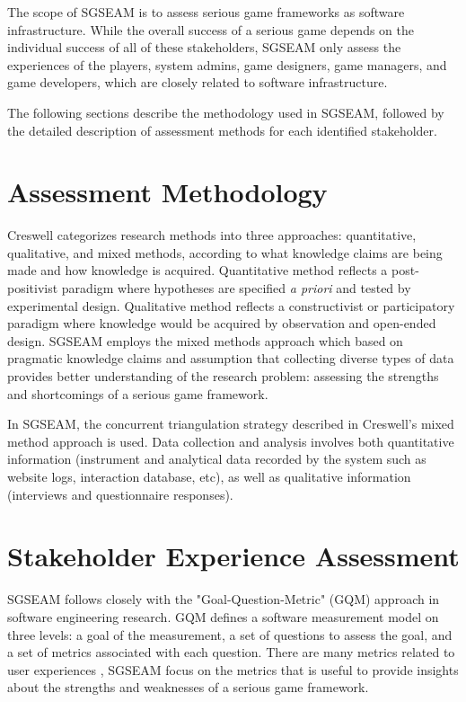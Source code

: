 The scope of SGSEAM is to assess serious game frameworks as software infrastructure. While
the overall success of a serious game depends on the individual success of all of these
stakeholders, SGSEAM only assess the experiences of the players, system admins, game designers, game managers, and game developers, which are closely related to software infrastructure. 

The following sections describe the methodology used in SGSEAM, followed by the detailed
description of assessment methods for each identified stakeholder.

\section{Assessment Methodology}
Creswell \cite{creswell2003} categorizes research methods into three approaches:
quantitative, qualitative, and mixed methods, according to what knowledge claims are being made
and how knowledge is acquired. Quantitative method reflects a post-positivist paradigm where
hypotheses are specified {\em a priori} and tested by experimental design. Qualitative method
reflects a constructivist or participatory paradigm where knowledge would be acquired by
observation and open-ended design. SGSEAM employs the mixed methods approach which based on
pragmatic knowledge claims and assumption that collecting diverse types of data provides better
understanding of the research problem: assessing the strengths and shortcomings of a serious game
framework.

In SGSEAM, the concurrent triangulation strategy described in Creswell's mixed method approach
is used.  Data collection and analysis involves both quantitative information (instrument and
analytical data recorded by the system such as website logs, interaction database, etc), as well
as qualitative information (interviews and questionnaire responses).

\section{Stakeholder Experience Assessment}

SGSEAM follows closely with the "Goal-Question-Metric" (GQM) approach \cite{caldiera1994goal} in
software engineering research. GQM defines a software  measurement model on three levels: a goal
of the measurement, a set of questions to assess the goal, and a set of metrics associated with
each question. There are many metrics related to user experiences \cite{tullis2010measuring}, SGSEAM
focus on the metrics that is useful to provide insights about the strengths and weaknesses of a serious
game framework.

